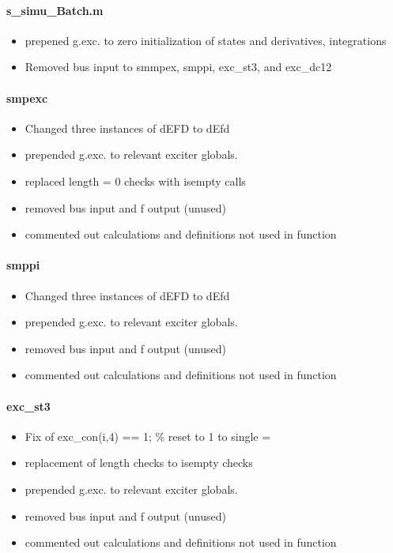 \documentclass[12pt]{article}
\begin{document}
\paragraph{s\_simu\_Batch.m}
	\begin{itemize}
		\item  prepened g.exc. to zero initialization of states and derivatives, integrations
		\item Removed bus input to smmpex, smppi, exc\_st3, and exc\_dc12
	\end{itemize}

\paragraph{smpexc}
	\begin{itemize}
		\item  Changed three instances of dEFD to dEfd
		\item prepended g.exc. to relevant exciter globals.
		\item replaced length = 0 checks with isempty calls
		\item removed bus input and f output (unused)
		\item commented out calculations and definitions not used in function
	\end{itemize}
\paragraph{smppi}
	\begin{itemize}
		\item  Changed three instances of dEFD to dEfd
		\item prepended g.exc. to relevant exciter globals.
		\item removed bus input and f output (unused)
		\item commented out calculations and definitions not used in function
	\end{itemize}
\paragraph{exc\_st3}
	\begin{itemize}
		\item  Fix of exc\_con(i,4) == 1; \% reset to 1 to single =
		\item  replacement of length checks to isempty checks
		\item prepended g.exc. to relevant exciter globals.
		\item removed bus input and f output (unused)
		\item commented out calculations and definitions not used in function
	\end{itemize}
\end{document}
